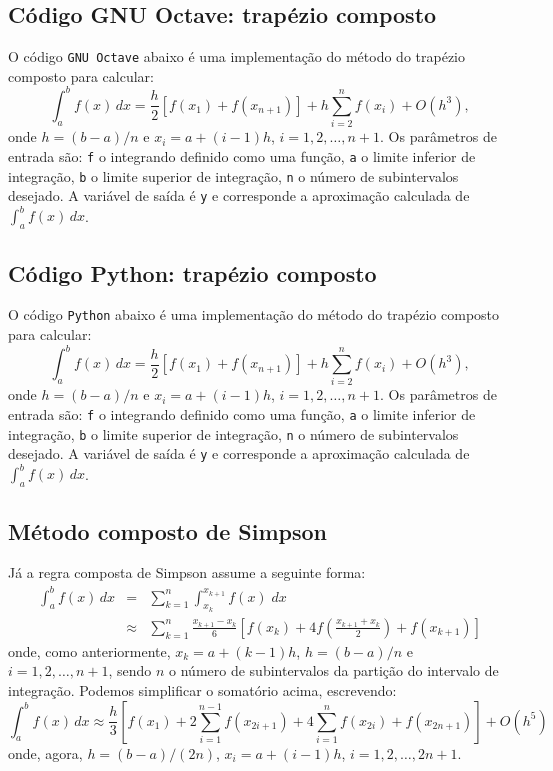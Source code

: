 \subsection{Código GNU Octave: trapézio composto}
O código \verb+GNU Octave+ abaixo é uma implementação do método do trapézio composto para calcular:
\begin{equation}
  \int_a^b f(x)\,dx = \frac{h}{2}\left[f(x_1) + f(x_{n+1})\right] + h\sum_{i=2}^n f(x_i) + O(h^3),
\end{equation}
onde $h = (b-a)/n$ e $x_i = a + (i-1)h$, $i=1,2,\dotsc,n+1$. Os parâmetros de entrada são: \verb+f+ o integrando definido como uma função, \verb+a+ o limite inferior de integração, \verb+b+ o limite superior de integração, \verb+n+ o número de subintervalos desejado. A variável de saída é \verb+y+ e corresponde a aproximação calculada de $\int_a^b f(x)\, dx$.


\fi
\ifispython
\subsection{Código Python: trapézio composto}
O código \verb+Python+ abaixo é uma implementação do método do trapézio composto para calcular:
\begin{equation}
  \int_a^b f(x)\,dx = \frac{h}{2}\left[f(x_1) + f(x_{n+1})\right] + h\sum_{i=2}^n f(x_i) + O(h^3),
\end{equation}
onde $h = (b-a)/n$ e $x_i = a + (i-1)h$, $i=1,2,\dotsc,n+1$. Os parâmetros de entrada são: \verb+f+ o integrando definido como uma função, \verb+a+ o limite inferior de integração, \verb+b+ o limite superior de integração, \verb+n+ o número de subintervalos desejado. A variável de saída é \verb+y+ e corresponde a aproximação calculada de $\int_a^b f(x)\, dx$.

\construirPython

\fi

\subsection{Método composto de Simpson}
Já a regra composta de Simpson assume a seguinte forma:
\begin{eqnarray}
  \int_{a}^b f(x)\,dx &=& \sum_{k=1}^{n} \int_{x_k}^{x_{k+1}} f(x)\;dx \\
  &\approx& \sum_{k=1}^{n} \frac{x_{k+1}-x_k}{6}\left[f(x_k) + 4f\left(\frac{x_{k+1}+x_k}{2}\right)+f(x_{k+1})\right]
\end{eqnarray}
onde, como anteriormente, $x_k = a + (k-1)h$, $h = (b-a)/n$ e $i = 1,2,\dotsc,n+1$, sendo $n$ o número de subintervalos da partição do intervalo de integração. Podemos simplificar o somatório acima, escrevendo:
\begin{equation}
  \int_{a}^b f(x)\,dx \approx \frac{h}{3}\left[f(x_1) + 2\sum_{i=1}^{n-1} f(x_{2i+1}) + 4\sum_{i=1}^{n} f(x_{2i}) + f(x_{2n+1})\right] + O(h^5)
\end{equation}
onde, agora, $h = (b-a)/(2n)$, $x_i = a + (i-1)h$, $i=1,2,\dotsc,2n+1$.

